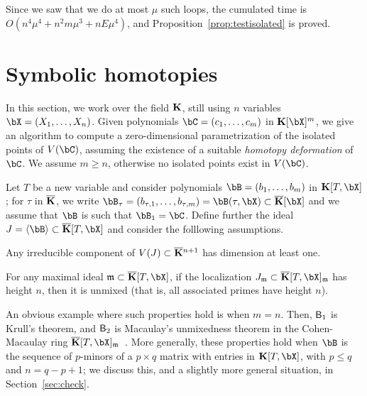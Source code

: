\documentclass[12pt]{article}
\begin{document}
Since we saw that we do at most $\mu$ such loops, the cumulated time
is $O(n^4 \mu^4 + n^2 m \mu^3 + n E \mu^4)$, and
Proposition~\ref{prop:testisolated} is proved.



\section{Symbolic homotopies}\label{sec:homotopy}

In this section, we work over the field $\mathbf{K}$, still using $n$ variables
$\bX=(X_1,\dots,X_n)$. Given polynomials $\bC=(c_1,\dots,c_m)$ in
$\KK[\bX]^m$, we give an algorithm to compute a zero-dimensional
parametrization of the isolated points of $V(\bC)$, assuming the
existence of a suitable {\em homotopy deformation} of $\bC$. We assume
$m\ge n$, otherwise no isolated points exist in $V(\bC)$.

Let $T$ be a new variable and consider polynomials
$\bB=(b_1,\dots,b_m)$ in $\KK[T,\bX]$; for $\tau$ in $\overline{\mathbf{K}}$,
we write $\bB_\tau=(b_{\tau,1},\dots,b_{\tau,m})=\bB(\tau,\bX)\subset
\KKbar[\bX]$ and we assume that $\bB$ is such that $\bB_1=\bC$.
Define further the ideal $J=\langle \bB \rangle \subset \KKbar[T,\bX]$ and
consider the folllowing assumptions.
\begin{description}[leftmargin=*]
\item[$\assA_1.$] Any irreducible component of $V(J) \subset
  \overline{\mathbf{K}}{}^{n+1}$ has dimension at least one.
\item[$\assA_2.$] For any maximal ideal $\m \subset\KKbar[T,\bX]$, if the
  localization $J_\m \subset \KKbar[T,\bX]_\m$ has height $n$, then it is
  unmixed (that is, all associated primes have height $n$).
\end{description}
An obvious example where such properties hold is when $m=n$. Then,
$\mathsf{B}_1$ is Krull's theorem, and $\mathsf{B}_2$ is Macaulay's unmixedness
theorem in the Cohen-Macaulay ring
$\KKbar[T,\bX]_\m$~\cite[Corollary~18.14]{Eisenbud95}. More generally,
these properties hold when $\bB$ is the sequence of $p$-minors of a $p
\times q$ matrix with entries in $\KK[T,\bX]$, with $p \le q$ and $n=q-p+1$; we
discuss this, and a slightly more general situation, in Section~\ref{sec:check}.  
\end{document}
